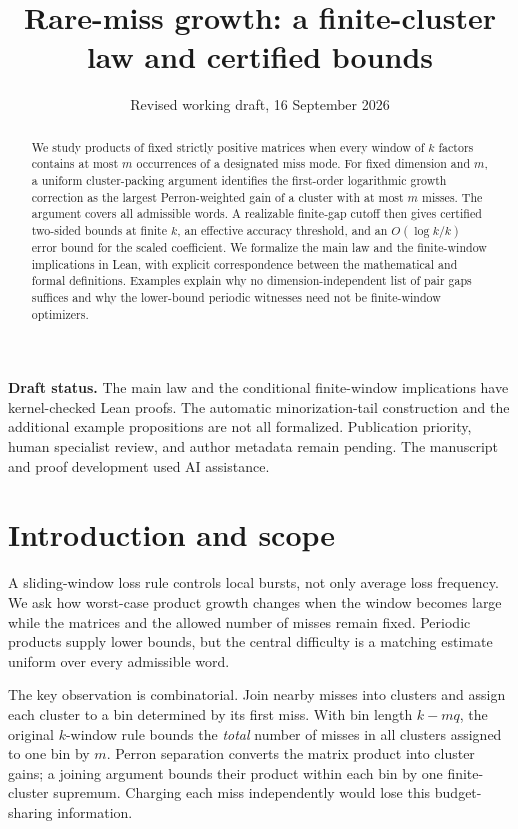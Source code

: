 \documentclass[11pt,letterpaper]{article}
\title{Rare-miss growth: a finite-cluster law and certified bounds}
\author{}
\date{Revised working draft, 16 September 2026}
\theoremstyle{remark}
\begin{document}
\maketitle
\begin{abstract}
We study products of fixed strictly positive matrices when every window of
$k$ factors contains at most $m$ occurrences of a designated miss mode.
For fixed dimension and $m$, a uniform cluster-packing argument identifies
the first-order logarithmic growth correction as the largest Perron-weighted
gain of a cluster with at most $m$ misses. The argument covers all admissible
words. A realizable finite-gap cutoff then gives certified two-sided bounds
at finite $k$, an effective accuracy threshold, and an $O(\log k/k)$ error
bound for the scaled coefficient. We formalize the main law and the
finite-window implications in Lean, with explicit correspondence between
the mathematical and formal definitions. Examples explain why no
dimension-independent list of pair gaps suffices and why the lower-bound
periodic witnesses need not be finite-window optimizers.
\end{abstract}

\noindent\textbf{Draft status.} The main law and the conditional finite-window
implications have kernel-checked Lean proofs. The automatic minorization-tail
construction and the additional example propositions are not all formalized.
Publication priority, human specialist review, and author metadata remain pending.
The manuscript and proof development used AI assistance.

\section{Introduction and scope}

A sliding-window loss rule controls local bursts, not only average loss
frequency. We ask how worst-case product growth changes when the window
becomes large while the matrices and the allowed number of misses remain
fixed. Periodic products supply lower bounds, but the central difficulty is
a matching estimate uniform over every admissible word.

The key observation is combinatorial. Join nearby misses into clusters and
assign each cluster to a bin determined by its first miss. With bin length
$k-mq$, the original $k$-window rule bounds the \emph{total} number of misses
in all clusters assigned to one bin by $m$. Perron separation converts the
matrix product into cluster gains; a joining argument bounds their product
within each bin by one finite-cluster supremum. Charging each miss
independently would lose this budget-sharing information.
\end{document}
